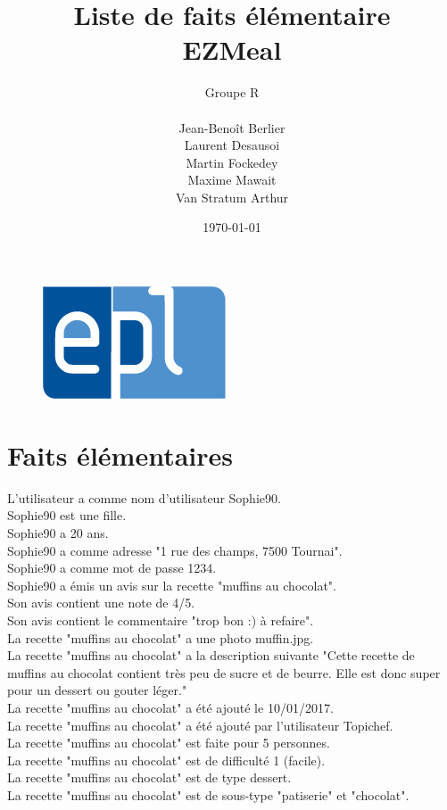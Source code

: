 \documentclass[a4paper,10pt]{article}
\title{Liste de faits élémentaire\\ EZMeal}
\author{Groupe R\\ \\Jean-Benoît Berlier\\Laurent Desausoi \\ Martin Fockedey \\Maxime Mawait \\Van Stratum Arthur
}
\date{\today}
\begin{document}
\begin{titlepage}
\begin{figure}[t]
\includegraphics[scale=0.3]{epl-logo.jpg}
\end{figure}

\maketitle 
\end{titlepage}
\section*{Faits élémentaires}
L'utilisateur a comme nom d'utilisateur Sophie90.\\
Sophie90 est une fille.\\
Sophie90 a 20 ans.\\
Sophie90 a comme adresse "1 rue des champs, 7500 Tournai".\\
Sophie90 a comme mot de passe 1234.\\
Sophie90 a émis un avis sur la recette "muffins au chocolat".\\
Son avis contient une note de 4/5.\\
Son avis contient le commentaire "trop bon :) à refaire".\\
La recette "muffins au chocolat" a une photo muffin.jpg.\\
La recette "muffins au chocolat" a la description suivante "Cette recette de muffins au chocolat contient très peu de sucre et de beurre. Elle est donc super pour un dessert ou gouter léger."\\
La recette "muffins au chocolat" a été ajouté le 10/01/2017.\\
La recette "muffins au chocolat" a été ajouté par l'utilisateur Topichef.\\
La recette "muffins au chocolat" est faite pour 5 personnes.\\
La recette "muffins au chocolat" est de difficulté 1 (facile).\\
La recette "muffins au chocolat" est de type dessert.\\
La recette "muffins au chocolat" est de sous-type "patiserie" et "chocolat".\\
\end{document}
